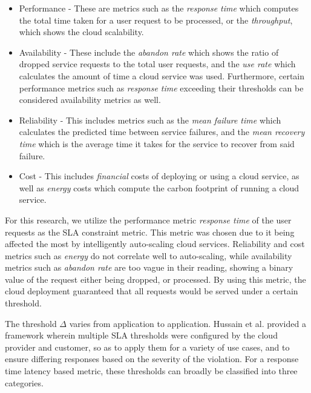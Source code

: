 \begin{itemize}
    \item Performance - These are metrics such as the \textit{response time} which computes the total time taken for a user request to be processed, or the \textit{throughput}, which shows the cloud scalability.
    \item Availability - These include the \textit{abandon rate} which shows the ratio of dropped service requests to the total user requests, and the \textit{use rate} which calculates the amount of time a cloud service was used. Furthermore, certain performance metrics such as \textit{response time} exceeding their thresholds can be considered availability metrics as well.
    \item Reliability - This includes metrics such as the \textit{mean failure time} which calculates the predicted time between service failures, and the \textit{mean recovery time} which is the average time it takes for the service to recover from said failure.
    \item Cost - This includes \textit{financial} costs of deploying or using a cloud service, as well as \textit{energy} costs which compute the carbon footprint of running a cloud service.
\end{itemize}

For this research, we utilize the performance metric \textit{response time} of the user requests as the SLA constraint metric. This metric was chosen due to it being affected the most by intelligently auto-scaling cloud services. Reliability and cost metrics such as \textit{energy} do not correlate well to auto-scaling, while availability metrics such as \textit{abandon rate} are too vague in their reading, showing a binary value of the request either being dropped, or processed. By using this metric, the cloud deployment guaranteed that all requests would be served under a certain threshold.

The threshold $\Delta$ varies from application to application. Hussain et al. \cite{hussain2016sla} provided a framework wherein multiple SLA thresholds were configured by the cloud provider and customer, so as to apply them for a variety of use cases, and to ensure differing responses based on the severity of the violation. For a response time latency based metric, these thresholds can broadly be classified into three categories.

